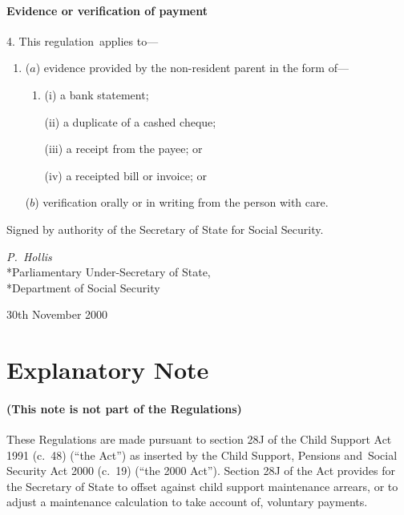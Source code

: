 \documentclass[12pt,a4paper]{article}
\begin{document}
\subsection[4. Evidence or verification of payment]{Evidence or verification of payment}

4.  This regulation~applies to—
\begin{enumerate}\item[]
($a$) evidence provided by the non-resident parent in the form of—
\begin{enumerate}\item[]
(i) a bank statement;

(ii) a duplicate of a cashed cheque;

(iii) a receipt from the payee; or

(iv) a receipted bill or invoice; or
\end{enumerate}

($b$) verification orally or in writing from the person with care.
\end{enumerate}

\bigskip

Signed 
by authority of the Secretary of State for Social Security.

{\raggedleft
\emph{P.~Hollis}\\*Parliamentary Under-Secretary of State,\\*Department of Social Security

}

30th November 2000

\small

\part{Explanatory Note}

\renewcommand\parthead{--- Explanatory Note}

\subsection*{(This note is not part of the Regulations)}

These Regulations are made pursuant to section 28J of the Child Support Act 1991 (c.\ 48) (“the Act”) as inserted by the Child Support, Pensions and~Social Security Act 2000 (c.\ 19) (“the 2000 Act”). Section 28J of the Act provides for the Secretary of State to offset against child support maintenance arrears, or to adjust a maintenance calculation to take account of, voluntary payments.
\end{document}
